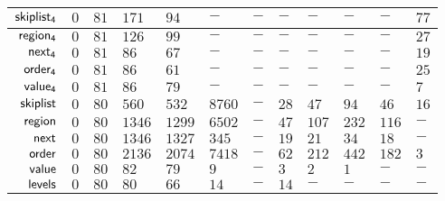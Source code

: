 {\begin{tabular}{ |r||T|T|T||T|T|T|T|T|T|T|T||}
		$\mathsf{skiplist_{4}}$  & $0$ & $81$ &$171$ & $94$ &  $-$ & $-$ &  $-$ &  $-$  &  $-$  & $-$ &$77$ \\ \hline
		$\mathsf{region_{4}}$	  & $0$ & $81$ &$126$ & $99$ &  $-$ & $-$ &  $-$ &  $-$  &  $-$  & $-$ &$27$ \\ \hline
		$\mathsf{next_{4}}$		  & $0$ & $81$ &$ 86$ & $67$ &  $-$ & $-$ &  $-$ &  $-$  &  $-$  & $-$ &$19$ \\ \hline
		$\mathsf{order_{4}}$		  & $0$ & $81$ &$ 86$ & $61$ &  $-$ & $-$ &  $-$ &  $-$  &  $-$  & $-$ &$25$ \\ \hline
		$\mathsf{value_{4}}$		  & $0$ & $81$ &$ 86$ & $79$ &  $-$ & $-$ &  $-$ &  $-$  &  $-$  & $-$ & $7$ \\ \hline \hline
		$\mathsf{skiplist}$			& $0$ & $80$ &$560$ &$532$ &$8760$& $-$ & $28$ & $47$  &  $94$ &$46$ &$16$ \\ \hline
		$\mathsf{region}$			& $0$ & $80$ &$1346$&$1299$&$6502$& $-$ & $47$ & $107$ & $232$ &$116$& $-$ \\ \hline
		$\mathsf{next}$				& $0$ & $80$ &$1346$&$1327$& $345$& $-$ & $19$ &  $21$ &  $34$ & $18$& $-$ \\ \hline
		$\mathsf{order}$				& $0$ & $80$ &$2136$&$2074$&$7418$& $-$ & $62$ & $212$ & $442$ &$182$& $3$ \\ \hline
		$\mathsf{value}$				& $0$ & $80$ & $82$ & $79$ &  $9$ & $-$ &  $3$ &   $2$ &   $1$ & $-$ & $-$ \\ \hline
		$\mathsf{levels}$			& $0$ & $80$ & $80$ & $66$ & $14$ & $-$ & $14$ &   $-$ &   $-$ & $-$ & $-$ \\ \hline
	\end{tabular}
}


